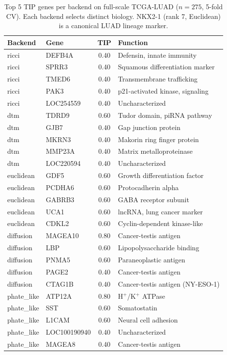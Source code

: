 \documentclass[12pt]{article}
\begin{document}
\begin{table}[h]
\centering\small
\begin{tabular}{llcl}
\toprule
\textbf{Backend} & \textbf{Gene} & \textbf{TIP} & \textbf{Function} \\
\midrule
ricci & DEFB4A & 0.40 & Defensin, innate immunity \\
ricci & SPRR3 & 0.40 & Squamous differentiation marker \\
ricci & TMED6 & 0.40 & Transmembrane trafficking \\
ricci & PAK3 & 0.40 & p21-activated kinase, signaling \\
ricci & LOC254559 & 0.40 & Uncharacterized \\
\midrule
dtm & TDRD9 & 0.60 & Tudor domain, piRNA pathway \\
dtm & GJB7 & 0.40 & Gap junction protein \\
dtm & MKRN3 & 0.40 & Makorin ring finger protein \\
dtm & MMP23A & 0.40 & Matrix metalloproteinase \\
dtm & LOC220594 & 0.40 & Uncharacterized \\
\midrule
euclidean & GDF5 & 0.60 & Growth differentiation factor \\
euclidean & PCDHA6 & 0.60 & Protocadherin alpha \\
euclidean & GABRB3 & 0.60 & GABA receptor subunit \\
euclidean & UCA1 & 0.60 & lncRNA, lung cancer marker \\
euclidean & CDKL2 & 0.60 & Cyclin-dependent kinase-like \\
\midrule
diffusion & MAGEA10 & 0.80 & Cancer-testis antigen \\
diffusion & LBP & 0.60 & Lipopolysaccharide binding \\
diffusion & PNMA5 & 0.60 & Paraneoplastic antigen \\
diffusion & PAGE2 & 0.40 & Cancer-testis antigen \\
diffusion & CTAG1B & 0.40 & Cancer-testis antigen (NY-ESO-1) \\
\midrule
phate\_like & ATP12A & 0.80 & H$^+$/K$^+$ ATPase \\
phate\_like & SST & 0.60 & Somatostatin \\
phate\_like & L1CAM & 0.60 & Neural cell adhesion \\
phate\_like & LOC100190940 & 0.40 & Uncharacterized \\
phate\_like & MAGEA8 & 0.40 & Cancer-testis antigen \\
\bottomrule
\end{tabular}
\caption{Top 5 TIP genes per backend on full-scale TCGA-LUAD ($n = 275$, 5-fold CV). Each backend selects distinct biology. NKX2-1 (rank 7, Euclidean) is a canonical LUAD lineage marker.}
\label{tab:fullscale_genes}
\end{table}
\end{document}
